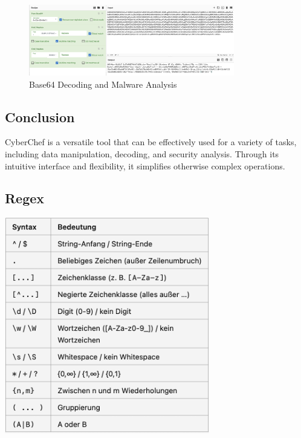 \begin{figure}[h!]
    \centering
    \includegraphics[width=0.8\textwidth]{resources/01_cyberchef.png}
    \caption{Base64 Decoding and Malware Analysis}
    \label{fig:malware}
\end{figure}

\subsection{Conclusion}
CyberChef is a versatile tool that can be effectively used for a variety of tasks, including data manipulation, decoding, and security analysis. Through its intuitive interface and flexibility, it simplifies otherwise complex operations.


\subsection{Regex}

\begin{center}
    \includegraphics[scale=1]{resources/01_regex.png}
\end{center}

